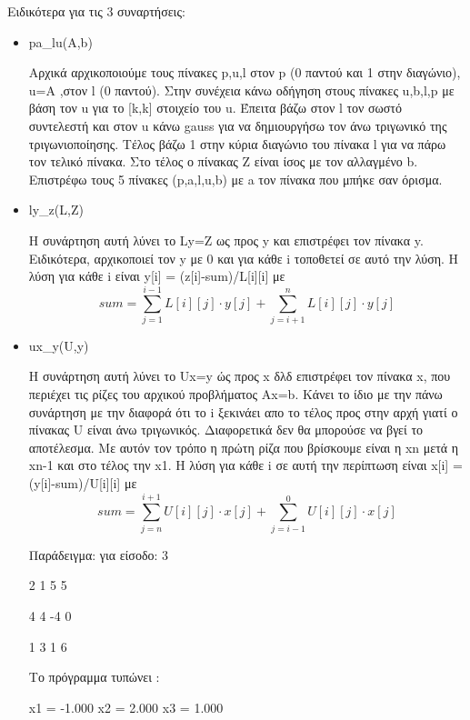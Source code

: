 \documentclass{article}
\begin{document}
    Ειδικότερα για τις 3 συναρτήσεις:
    \begin{itemize}
        \item pa\_lu(Α,b)
        
        Αρχικά αρχικοποιούμε τους πίνακες p,u,l στον p (0 παντού και 1 στην διαγώνιο), u=A ,στον  l (0 παντού).
        Στην συνέχεια κάνω οδήγηση στους πίνακες u,b,l,p με βάση τον u για το [k,k] στοιχείο του u.
        Έπειτα βάζω στον l τον σωστό συντελεστή και στον u κάνω gauss για να δημιουργήσω τον άνω τριγωνικό της τριγωνιοποίησης. 
        Τέλος βάζω 1 στην κύρια διαγώνιο του πίνακα l για να πάρω τον τελικό πίνακα.
        Στο τέλος ο πίνακας Z είναι ίσος με τον αλλαγμένο b. 	
        Επιστρέφω τους 5 πίνακες (p,a,l,u,b)  με a τον πίνακα που μπήκε σαν όρισμα.
        
        \item ly\_z(L,Z)
        
        Η συνάρτηση αυτή λύνει το Ly=Z ως προς y και επιστρέφει τον πίνακα y.
        Ειδικότερα, αρχικοποιεί τον y με 0 και για κάθε i τοποθετεί σε αυτό την λύση. Η λύση για κάθε i είναι 
        y[i] = (z[i]-sum)/L[i][i] με 
        \begin{equation*}
            sum = \sum_{j=1}^{i-1}L[i][j] \cdot y[j] + \sum_{j=i+1}^{n}L[i][j] \cdot y[j]
        \end{equation*}

        
        \item ux\_y(U,y)

        Η συνάρτηση αυτή λύνει το Ux=y ώς προς x δλδ επιστρέφει τον πίνακα x, που περιέχει τις ρίζες του
        αρχικού προβλήματος Ax=b. Κάνει το ίδιο με την πάνω συνάρτηση με την διαφορά ότι το i ξεκινάει απο 
        το τέλος προς στην αρχή γιατί ο πίνακας U είναι άνω τριγωνικός. Διαφορετικά δεν θα μπορούσε να βγεί 
        το αποτέλεσμα. Με αυτόν τον τρόπο η πρώτη ρίζα που βρίσκουμε είναι η xn μετά η xn-1 και στο τέλος την x1. Η λύση για κάθε i σε αυτή την περίπτωση είναι 
        x[i] = (y[i]-sum)/U[i][i] με 
        \begin{equation*}
            sum = \sum_{j=n}^{i+1}U[i][j] \cdot x[j] + \sum_{j=i-1}^{0}U[i][j] \cdot x[j]
        \end{equation*}


    Παράδειγμα: για είσοδο: 3
    
    2 1 5 5

    4 4 -4 0

    1 3 1 6

    Το πρόγραμμα τυπώνει :
    
    x1 = -1.000 
    x2 = 2.000 
    x3 = 1.000 
    \end{itemize}
    
\end{document}
